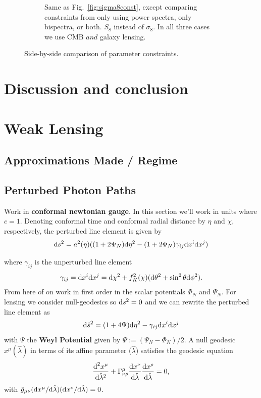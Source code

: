 \documentclass[11pt]{article} %
\DeclareRobustCommand{\d}{\ifmmode\text{d}\else d\fi}
\begin{document}
\begin{figure}[htbp]
\begin{subfigure}[t]{0.48\textwidth}
        \caption{Same as Fig.~\ref{fig:sigma8const}, except comparing constraints from only using power spectra, only bispectra, or both. $S_8$ instead of $\sigma_8$. In all three cases we use CMB $and$ galaxy lensing.}
        \label{fig:S8const}
    \end{subfigure}
    \caption{Side-by-side comparison of parameter constraints.}
    \label{fig:side_by_side}
\end{figure}

\section{Discussion and conclusion}\label{sec:discussion}
\printbibliography

\appendix

\section{Weak Lensing}\label{sec:weaklensing}
\subsection{Approximations Made / Regime}
\subsection{Perturbed Photon Paths}
Work in \textbf{conformal newtonian gauge}. In this section we'll work in units where $c=1$. Denoting conformal time and conformal radial distance by $\eta$ and $\chi$, respectively, the perturbed line element is given by
\begin{equation}
    \d s^2 = a^2(\eta)((1 + 2\Psi_N) \d \eta^2 - (1 + 2\Phi_N) \gamma_{ij}\d x^i \d x^j) 
\end{equation}

where $\gamma_{ij}$ is the unperturbed line element
\begin{equation}
    \gamma_{ij} = \d x^i \d x^j = \d \chi^2 + f^2_K(\chi)(\d \theta^2 + \sin ^2 \theta \d \phi ^2).
\end{equation}
From here of on work in first order in the scalar potentials $\Phi_N$ and $\Psi_N$. For lensing we consider null-geodesics so $\d s^2 = 0$ and we can rewrite the perturbed line element as
\begin{equation}
    \d \hat s^2 = (1 + 4\Psi)\d\eta^2 - \gamma_{ij} \d x^i \d x^j
\end{equation}
with $\Psi$ the \textbf{Weyl Potential} given by $\Psi := (\Psi_N - \Phi_N)/2$. A null geodesic $x^\mu(\hat\lambda)$ in terms of its affine parameter ($\hat \lambda$) satisfies the geodesic equation
\begin{equation}
    \frac{\d^2 x^\mu}{\d \hat\lambda^2} + \Gamma^\mu_{\nu\rho} \frac{\d x^\nu}{\d \hat\lambda}\frac{\d x^\rho}{\d\hat\lambda} = 0,
\end{equation}
with $\hat g_{\mu\nu}(\d x^\mu/\d \hat\lambda)(\d x^\nu / \d \hat \lambda) = 0$. 
\end{document}
